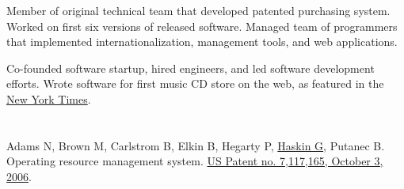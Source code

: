 \begin{resume}
\vspace{-0.5em}
\title{\small{}}
\begin{position}
Member of original technical team that developed patented purchasing system.  Worked on first six versions of released software. Managed team of programmers that implemented internationalization, management tools, and web applications.
\end{position}

\vspace{-0.5em}
\title{\small{}}
\begin{position}
Co-founded software startup, hired engineers, and led software development efforts. Wrote software for first music CD store on the web, as featured in the \href{http://select.nytimes.com/gst/abstract.html?res=FA0F1FFA3E540C718DDDA10894DC494D81}{New York Times}.
\end{position}




\section{}
Adams N, Brown M, Carlstrom B, Elkin B, Hegarty P, \underline{Haskin G}, Putanec B. Operating resource management system.  \href{http://patft.uspto.gov/netacgi/nph-Parser?Sect1=PTO1&Sect2=HITOFF&d=PALL&p=1&u=%2Fnetahtml%2FPTO%2Fsrchnum.htm&r=1&f=G&l=50&s1=7117165.PN.&OS=PN/7117165&RS=PN/7117165}{US Patent no. 7,117,165, October 3, 2006}.


\end{resume}
